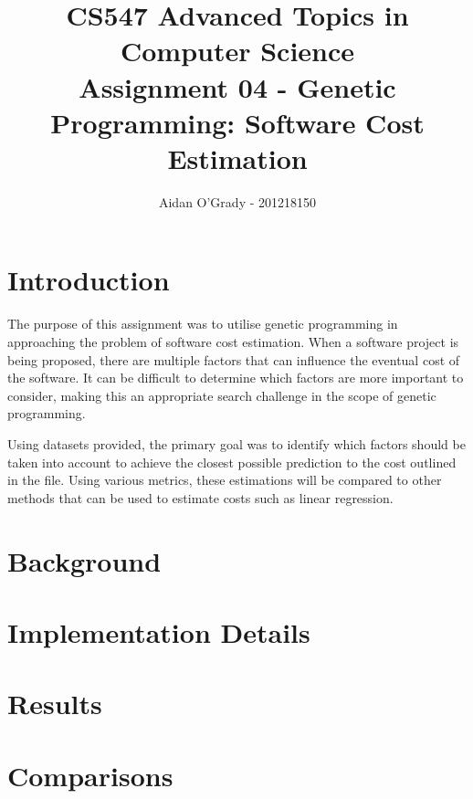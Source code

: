 \documentclass[11pt, a4paper]{article}
\begin{document}
\title{CS547 Advanced Topics in Computer Science\\
\large{Assignment 04 - Genetic Programming: Software Cost Estimation}}
\author{Aidan O'Grady - 201218150}
\date{}
\maketitle
\section{Introduction} %
\label{sec:introduction}
The purpose of this assignment was to utilise genetic programming in approaching
the problem of software cost estimation. When a software project is being
proposed, there are multiple factors that can influence the eventual cost of the
software. It can be difficult to determine which factors are more important to
consider, making this an appropriate search challenge in the scope of genetic
programming.

Using datasets provided, the primary goal was to identify which factors should
be taken into account to achieve the closest possible prediction to the cost
outlined in the file. Using various metrics, these estimations will be compared
to other methods that can be used to estimate costs such as linear regression.

\section{Background} %
\label{sec:background}

\section{Implementation Details} %
\label{sec:implementation_details}

\section{Results} %
\label{sec:results}

\section{Comparisons} %
\label{sec:comparisons}
\end{document}
